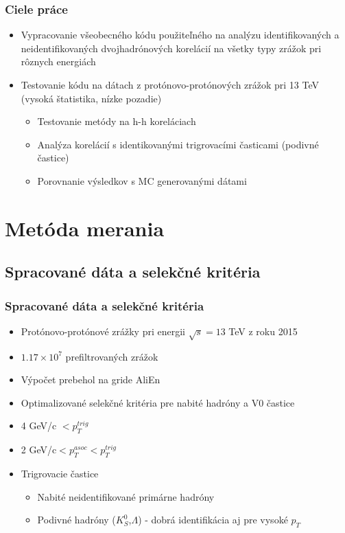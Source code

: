 \documentclass{beamer}
\begin{document}
	\begin{frame}
		\frametitle{Ciele práce}
		\begin{itemize}
			\item Vypracovanie všeobecného kódu použiteľného na analýzu identifikovaných a neidentifikovaných dvojhadrónových korelácií na všetky typy zrážok pri rôznych energiách
			\item Testovanie kódu na dátach z protónovo-protónových zrážok pri 13 TeV (vysoká štatistika, nízke pozadie)
			\begin{itemize}
				\item Testovanie metódy na h-h koreláciach
				\item Analýza korelácií s identikovanými trigrovacími časticami (podivné častice)
				\item Porovnanie výsledkov s MC generovanými dátami 
			\end{itemize}
		\end{itemize}
	\end{frame}

\section{Metóda merania}

	\subsection{Spracované dáta a selekčné kritéria}
	\begin{frame}
		\frametitle{Spracované dáta a selekčné kritéria}
		\begin{itemize}
			\item Protónovo-protónové zrážky pri energii $\sqrt{s}=13$ TeV z roku 2015
			\item $1.17\times10^7$ prefiltrovaných zrážok 
			\item Výpočet prebehol na gride AliEn
			\item Optimalizované selekčné kritéria pre nabité hadróny a V0 častice
			\item 4 GeV/c $<p_T^{trig}$
			\item 2 GeV/c$<p_T^{asoc}<p_T^{trig}$
			\item Trigrovacie častice
			\begin{itemize}
				\item Nabité neidentifikované primárne hadróny
				\item Podivné hadróny ($K^0_S$,$\Lambda$) - dobrá identifikácia aj pre vysoké $p_T$
			\end{itemize}
		\end{itemize}
	\end{frame}
\end{document}
